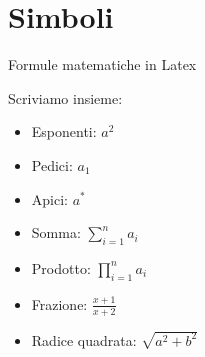\section{Simboli}
  \begin{frame}{Formule matematiche in Latex}

    Scriviamo insieme:
    
    \begin{itemize}
      \item<1-> Esponenti: $a^2$
      \item<2-> Pedici: $a_1$
      \item<3-> Apici: $a^{*}$
      \item<4-> Somma: $\sum_{i=1}^n a_i$
      \item<5-> Prodotto: $\prod_{i=1}^n a_i$
      \item<6-> Frazione: $\frac{x + 1}{x + 2}$
      \item<7-> Radice quadrata: $\sqrt{a^2 + b^2}$
    \end{itemize}

\end{frame}
